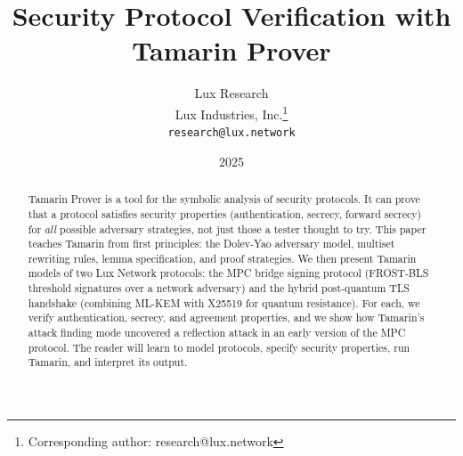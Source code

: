 \documentclass[11pt,a4paper]{article}
\title{Security Protocol Verification with Tamarin Prover}
\author{
Lux Research \\
Lux Industries, Inc.\thanks{Corresponding author: research@lux.network}\\
\texttt{research@lux.network}
}
\date{2025}
\begin{document}
\luxcoverpage

\begin{abstract}
Tamarin Prover is a tool for the symbolic analysis of security protocols. It can prove
that a protocol satisfies security properties (authentication, secrecy, forward secrecy)
for \emph{all} possible adversary strategies, not just those a tester thought to try.
This paper teaches Tamarin from first principles: the Dolev-Yao adversary model,
multiset rewriting rules, lemma specification, and proof strategies. We then present
Tamarin models of two Lux Network protocols: the MPC bridge signing protocol (FROST-BLS
threshold signatures over a network adversary) and the hybrid post-quantum TLS handshake
(combining ML-KEM with X25519 for quantum resistance). For each, we verify authentication,
secrecy, and agreement properties, and we show how Tamarin's attack finding mode uncovered
a reflection attack in an early version of the MPC protocol. The reader will learn to
model protocols, specify security properties, run Tamarin, and interpret its output.
\end{abstract}

\tableofcontents
\newpage










\end{document}
